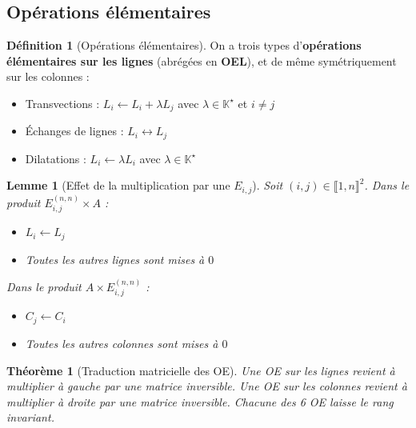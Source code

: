 \documentclass[french]{book}
\newcommand{\K}{\mathbb{K}}
\newcommand{\st}{^\star}
\theoremstyle{plain}
\newtheorem{thm}{Théorème}[chapter]
\newtheorem{lem}{Lemme}[chapter]
\theoremstyle{definition}
\newtheorem{dfn}{Définition}[chapter]
\theoremstyle{remark}
\begin{document}
\subsection{Opérations élémentaires}
\begin{dfn}[Opérations élémentaires]
	On a trois types d'\textbf{opérations élémentaires sur les lignes} (abrégées en \textbf{OEL}), et de même symétriquement sur les colonnes : 
	\begin{itemize}
		\item Transvections : $L_i\leftarrow L_i+\lambda L_j$ avec $\lambda\in\K\st$ et $i\ne j$
		\item Échanges de lignes : $L_i\leftrightarrow L_j$
		\item Dilatations : $L_i\leftarrow \lambda L_i$ avec $\lambda\in\K\st$
	\end{itemize}
\end{dfn}
\begin{lem}[Effet de la multiplication par une $E_{i,j}$]
	Soit $(i,j)\in\llbracket1,n\rrbracket^2$. Dans le produit $E_{i,j}^{(n,n)}\times A$ : 
	\begin{itemize}
		\item $L_i\leftarrow L_j$
		\item Toutes les autres lignes sont mises à $0$
	\end{itemize}
	Dans le produit $A\times E_{i,j}^{(n,n)}$ : 
	\begin{itemize}
		\item $C_j\leftarrow C_i$
		\item Toutes les autres colonnes sont mises à $0$
	\end{itemize}
\end{lem}
\begin{thm}[Traduction matricielle des OE]
	Une OE sur les lignes revient à multiplier à gauche par une matrice inversible. Une OE sur les colonnes revient à multiplier à droite par une matrice inversible. Chacune des 6 OE laisse le rang invariant.
\end{thm}
\end{document}
